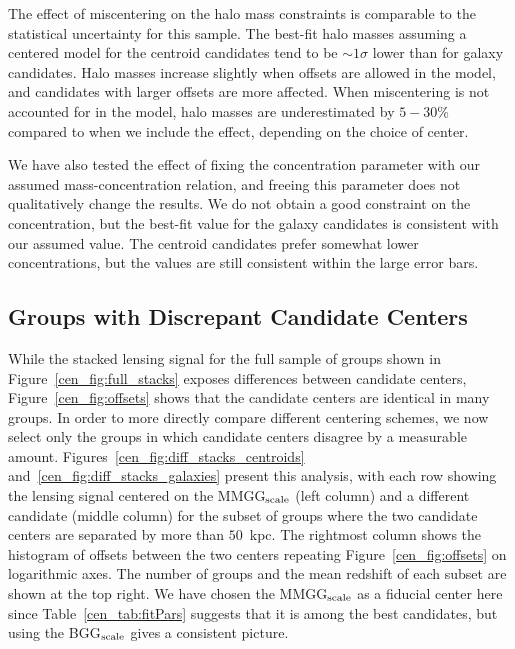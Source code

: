The effect of miscentering on the halo mass constraints is comparable
to the statistical uncertainty for this sample. The best-fit halo
masses assuming a centered model for the centroid candidates tend to
be $\sim1\sigma$ lower than for galaxy candidates. Halo masses
increase slightly when offsets are allowed in the model, and
candidates with larger offsets are more affected. When miscentering is
not accounted for in the model, halo masses are underestimated by
$5-30\%$ compared to when we include the effect, depending on the
choice of center.

We have also tested the effect of fixing the concentration parameter
with our assumed mass-concentration relation, and freeing this
parameter does not qualitatively change the results. We do not obtain
a good constraint on the concentration, but the best-fit value for the
galaxy candidates is consistent with our assumed value. The centroid
candidates prefer somewhat lower concentrations, but the values are
still consistent within the large error bars.

\subsection{Groups with Discrepant Candidate Centers}
\label{cen_s:discrepant}

 While the stacked lensing signal for the full sample of groups shown
in Figure~\ref{cen_fig:full_stacks} exposes differences between candidate
centers, Figure~\ref{cen_fig:offsets} shows that the candidate centers are
identical in many groups. In order to more directly compare different
centering schemes, we now select only the groups in which candidate
centers disagree by a measurable amount. Figures~\ref{cen_fig:diff_stacks_centroids}
and~\ref{cen_fig:diff_stacks_galaxies} present this analysis, with 
each row showing the lensing signal centered on the MMGG$_{\rm scale}$
(left column) and a different candidate (middle column) for the subset
of groups where the two candidate centers are separated by more than
$50$~{\rm kpc}. The rightmost column shows the histogram of offsets
between the two centers repeating Figure~\ref{cen_fig:offsets} on
logarithmic axes. The number of groups and the mean redshift
of each subset are shown at the top right. We have
  chosen the MMGG$_{\rm scale}$ as a fiducial center here since
  Table~\ref{cen_tab:fitPars} suggests that it is among the best
  candidates, but using the BGG$_{\rm scale}$ gives a consistent
  picture.

